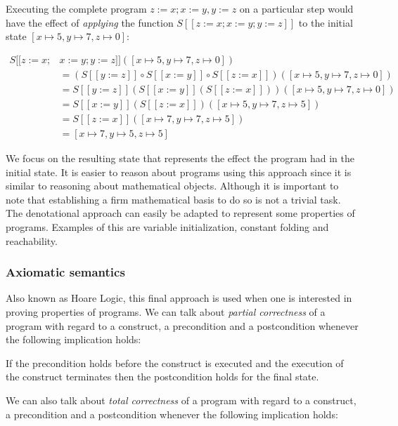 Executing the complete program $z:=x; x:=y, y:=z$ on a particular step would have the effect of \textit{applying} the function $S [\![ z:=x; x:=y; y:=z ]\!]$ to the initial state $[x\mapsto5, y\mapsto7, z\mapsto0]$:

\begin{align*}
S [\![ z:=x; & x:=y; y:=z ]\!]([x\mapsto5, y\mapsto7, z\mapsto0])\\
&= (S [\![ y:=z ]\!] \circ S [\![ x:=y ]\!] \circ S [\![ z:=x ]\!])([x\mapsto5, y\mapsto7, z\mapsto0])\\
&= S [\![ y:=z ]\!](S [\![ x:=y ]\!] (S [\![ z:=x ]\!]))([x\mapsto5, y\mapsto7, z\mapsto0])\\
&= S [\![ x:=y ]\!] (S [\![ z:=x ]\!])([x\mapsto5, y\mapsto7, z\mapsto5])\\
&= S [\![ z:=x ]\!]([x\mapsto7, y\mapsto7, z\mapsto5])\\
&= [x\mapsto7, y\mapsto5, z\mapsto5]
\end{align*}

We focus on the resulting state that represents the effect the program had in the initial state.
It is easier to reason about programs using this approach since it is similar to reasoning about mathematical objects.
Although it is important to note that establishing a firm mathematical basis to do so is not a trivial task.
The denotational approach can easily be adapted to represent some properties of programs.
Examples of this are variable initialization, constant folding and reachability.~\parencite{nielson}


\subsubsection{Axiomatic semantics}

Also known as Hoare Logic, this final approach is used when one is interested in proving properties of programs.
We can talk about \textit{partial correctness} of a program with regard to a construct, a precondition and a postcondition whenever the following implication holds:

\begin{displayquote}
If the precondition holds before the construct is executed and the execution of the construct terminates then the postcondition holds for the final state.
\end{displayquote}

We can also talk about \textit{total correctness} of a program with regard to a construct, a precondition and a postcondition whenever the following implication holds:

